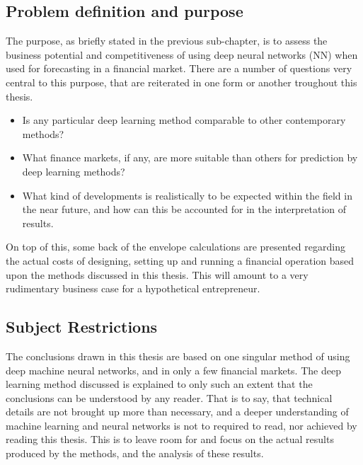 \subsection{Problem definition and purpose}

The purpose, as briefly stated in the previous sub-chapter, is to assess the business potential and competitiveness of using deep neural networks (NN) when used for forecasting in a financial market. There are a number of questions very central to this purpose, that are reiterated in one form or another troughout this thesis.

\begin{itemize}

\item Is any particular deep learning method comparable to other contemporary methods?

\item What finance markets, if any, are more suitable than others for prediction by deep learning methods?

\item What kind of developments is realistically to be expected within the field in the near future, and how can this be accounted for in the interpretation of results.

\end{itemize}

On top of this, some back of the envelope calculations are presented regarding the actual costs of designing, setting up and running a financial operation based upon the methods discussed in this thesis. This will amount to a very rudimentary business case for a hypothetical entrepreneur.




\subsection{Subject Restrictions}

The conclusions drawn in this thesis are based on one singular method of using deep machine neural networks, and in only a few financial markets. The deep learning method discussed is explained to only such an extent that the conclusions can be understood by any reader. That is to say, that technical details are not brought up more than necessary, and a deeper understanding of machine learning and neural networks is not to required to read, nor achieved by reading this thesis. This is to leave room for and focus on the actual results produced by the methods, and the analysis of these results.

